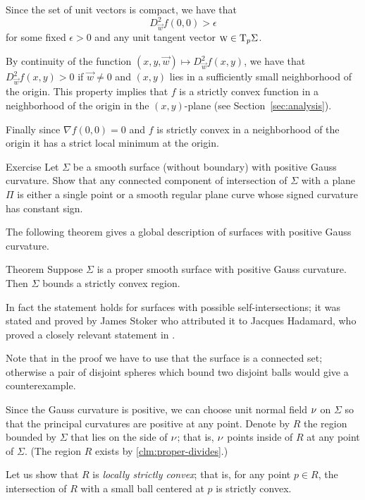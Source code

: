 Since the set of unit vectors is compact, we have that 
\[D^2_{\vec w}f(0,0)>\epsilon\]
for some fixed $\epsilon>0$ and any unit tangent vector ${\text{\sc{w}}}\in\mathrm{T}_p\Sigma$.

By continuity of the function $(x,y,{\vec w})\mapsto D^2_{\vec w}f(x,y)$,
we have that $D^2_{\vec w}f(x,y)>0$ if $\vec w\ne 0$ and $(x,y)$ lies in a sufficiently small neighborhood of the origin.
This property implies that $f$ is a strictly convex function in a neighborhood of the origin in the $(x,y)$-plane (see Section~\ref{sec:analysis}).

Finally since $\nabla f(0,0)=0$ and $f$ is strictly convex in a neighborhood of the origin it has a strict local minimum at the origin.
\qeds

\begin{thm}{Exercise}\label{ex:section-of-convex}
Let $\Sigma$ be a smooth surface (without boundary) with positive Gauss curvature.
Show that any connected component of intersection of $\Sigma$ with a plane $\Pi$ is either a single point or a smooth regular plane curve whose signed curvature has constant sign.
\end{thm}

The following theorem gives a global description of surfaces with positive Gauss curvature.

\begin{thm}{Theorem}\label{thm:convex-embedded}
Suppose $\Sigma$ is a proper smooth surface with positive Gauss curvature.
Then $\Sigma$ bounds a strictly convex region.
\end{thm}

In fact the statement holds for surfaces with possible self-intersections; it was stated and proved by James Stoker \cite{stoker} who attributed it to Jacques Hadamard, who proved a closely relevant statement in \cite[item 23]{hadamard}.

Note that in the proof we have to use that the surface is a connected set;
otherwise a pair of disjoint spheres which bound two disjoint balls would give a counterexample.

Since the Gauss curvature is positive, we can choose unit normal field $\nu$ on $\Sigma$ so that the principal curvatures are positive at any point.
Denote by $R$ the region bounded by $\Sigma$ that lies on the side of $\nu$;
that is, $\nu$ points inside of $R$ at any point of $\Sigma$.
(The region $R$ exists by \ref{clm:proper-divides}.)

Let us show that $R$ is {}\emph{locally strictly convex};
that is, for any point $p\in R$, the intersection of $R$ with a small ball centered at $p$ is strictly convex.

